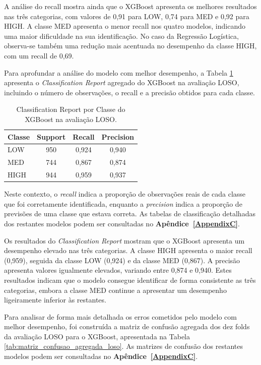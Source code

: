 A análise do recall mostra ainda que o XGBoost apresenta os melhores resultados nas três categorias, com valores de 0,91 para LOW, 0,74 para MED e 0,92 para HIGH. A classe MED apresenta o menor recall nos quatro modelos, indicando uma maior dificuldade na sua identificação. No caso da Regressão Logística, observa-se também uma redução mais acentuada no desempenho da classe HIGH, com um recall de 0,69.

Para aprofundar a análise do modelo com melhor desempenho, a Tabela \ref{tab:classification_report_xgboost_loso} apresenta o \textit{Classification Report} agregado do XGBoost na avaliação LOSO, incluindo o número de observações, o recall e a precisão obtidos para cada classe.

\begin{table}[H]
\centering
\caption{Classification Report por Classe do XGBoost na avaliação LOSO.}
\label{tab:classification_report_xgboost_loso}
\begin{tabular}{l c c c}
\hline
\textbf{Classe} & \textbf{Support} & \textbf{Recall} & \textbf{Precision} \\
\hline
LOW & 950 & 0,924 & 0,940 \\
MED & 744 & 0,867 & 0,874 \\
HIGH & 944 & 0,959 & 0,937 \\
\hline
\end{tabular}
\end{table}

Neste contexto, o \textit{recall} indica a proporção de observações reais de cada classe que foi corretamente identificada, enquanto a \textit{precision} indica a proporção de previsões de uma classe que estava correta. As tabelas de classificação detalhadas dos restantes modelos podem ser consultadas no \textbf{Apêndice~\ref{AppendixC}}.

Os resultados do \textit{Classification Report} mostram que o XGBoost apresenta um desempenho elevado nas três categorias. A classe HIGH apresenta o maior recall (0,959), seguida da classe LOW (0,924) e da classe MED (0,867). A precisão apresenta valores igualmente elevados, variando entre 0,874 e 0,940. Estes resultados indicam que o modelo consegue identificar de forma consistente as três categorias, embora a classe MED continue a apresentar um desempenho ligeiramente inferior às restantes.

Para analisar de forma mais detalhada os erros cometidos pelo modelo com melhor desempenho, foi construída a matriz de confusão agregada dos dez folds da avaliação LOSO para o XGBoost, apresentada na Tabela \ref{tab:matriz_confusao_agregada_loso}. As matrizes de confusão dos restantes modelos podem ser consultadas no \textbf{Apêndice~\ref{AppendixC}}.


